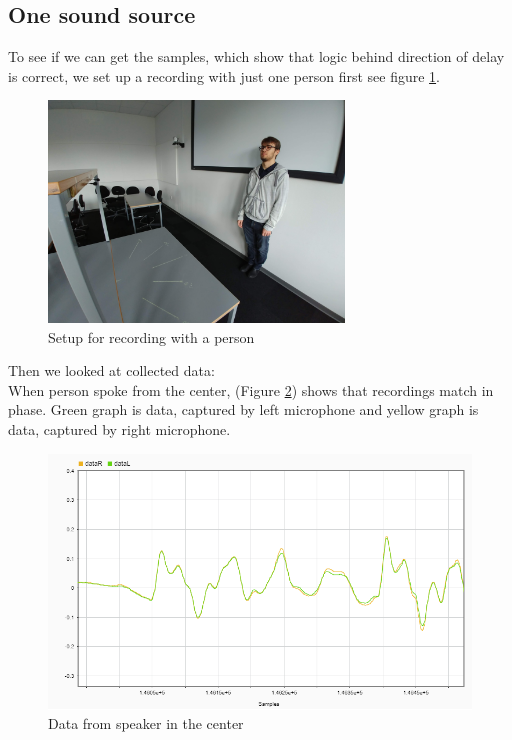 \subsection{One sound source}
To see if we can get the samples, which show that logic behind direction of delay is correct, we set up a 
recording with just one person first see figure \ref{fig:RanzvanRecSetup}.

\begin{figure}[htp]
	\centering
	\includegraphics[width=0.7\textwidth]{Illustrations/razvanWithSetup.jpg}
	\caption{Setup for recording with a person}
	\label{fig:RanzvanRecSetup}
\end{figure}

Then we looked at collected data:\\
When person spoke from the center, (Figure \ref{fig:C}) shows that recordings match in phase. Green graph is 
data, captured by left microphone and yellow graph is data, captured by right microphone.
\begin{figure}[htp]
  \centering
  \includegraphics[width=0.75\linewidth]{Illustrations/DataC.png}
  \caption{Data from speaker in the center}
  \label{fig:C}
\end{figure}

